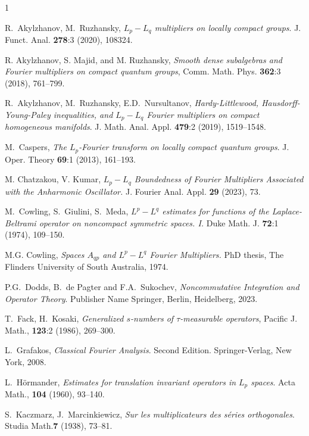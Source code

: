 \documentclass[a4paper,12pt]{amsart}
\numberwithin{equation}{section}
\theoremstyle{definition}
\begin{document}
\begin{thebibliography}{1}

 R.~Akylzhanov, M.~Ruzhansky, \textit{$L_p-L_q$ multipliers on locally compact groups}. J. Funct. Anal. \textbf{278}:3 (2020), 108324. 

 R. Akylzhanov, S. Majid, and M. Ruzhansky, \textit{Smooth dense subalgebras and Fourier multipliers on compact quantum groups}, Comm. Math. Phys. \textbf{362}:3 (2018), 761--799.

 R.~Akylzhanov, M.~Ruzhansky, E.D.~Nursultanov, \textit{Hardy-Littlewood, Hausdorff-Young-Paley inequalities, and $L_p-L_q$ Fourier multipliers on compact homogeneous manifolds}. J. Math. Anal. Appl. \textbf{479}:2 (2019), 1519--1548.

 M.~Caspers, \textit{The $L_p$-Fourier transform on locally compact quantum groups}. J. Oper. Theory \textbf{69}:1 (2013), 161--193.

 M. Chatzakou, V. Kumar, \textit{$L_p-L_q$ Boundedness of Fourier Multipliers Associated with the Anharmonic Oscillator.} J. Fourier Anal. Appl. \textbf{29} 
(2023), 73.


 M.~Cowling, S.~Giulini, S.~Meda, \textit{$L^p-L^q$ estimates for functions of the Laplace-Beltrami operator on noncompact symmetric spaces. I.} Duke Math. J. \textbf{72}:1 (1974), 109--150.


 M.G. Cowling, \textit{Spaces $A_{qp}$ and $L^p-L^q$ Fourier Multipliers.} PhD thesis, The Flinders University of South Australia, 1974. 

 P.G.~Dodds, B.~de Pagter and F.A.~Sukochev, \textit{Noncommutative Integration and Operator Theory}. Publisher Name Springer, Berlin, Heidelberg, 2023. 

 T.~Fack, H.~Kosaki, \textit{Generalized $s$-numbers of $\tau$-measurable operators}, Pacific J. Math., \textbf{123}:2 (1986), 269--300.

 L.~Grafakos, \textit{Classical Fourier Analysis}. Second Edition. Springer-Verlag, New York, 2008. 


 L.~H\"ormander, \textit{Estimates for translation invariant operators in $L_p$ spaces}. Acta Math., \textbf{104} (1960), 93--140.

 S.~Kaczmarz, J.~Marcinkiewicz, \textit{Sur les multiplicateurs des s\'{e}ries orthogonales}. Studia Math.\textbf{7} (1938), 73--81.


\end{thebibliography}
\end{document}
